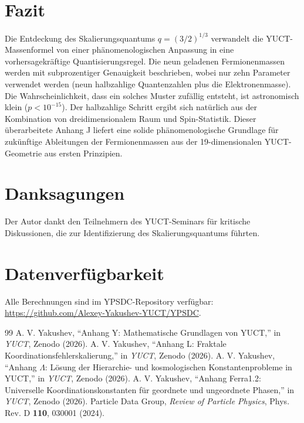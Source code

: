 \documentclass[12pt,a4paper]{article}
\begin{document}
	\section{Fazit}
	
	Die Entdeckung des Skalierungsquantums \(q = (3/2)^{1/3}\) verwandelt die YUCT-Massenformel von einer phänomenologischen Anpassung in eine vorhersagekräftige Quantisierungsregel. Die neun geladenen Fermionenmassen werden mit subprozentiger Genauigkeit beschrieben, wobei nur zehn Parameter verwendet werden (neun halbzahlige Quantenzahlen plus die Elektronenmasse). Die Wahrscheinlichkeit, dass ein solches Muster zufällig entsteht, ist astronomisch klein (\(p < 10^{-15}\)). Der halbzahlige Schritt ergibt sich natürlich aus der Kombination von dreidimensionalem Raum und Spin-Statistik. Dieser überarbeitete Anhang J liefert eine solide phänomenologische Grundlage für zukünftige Ableitungen der Fermionenmassen aus der 19-dimensionalen YUCT-Geometrie aus ersten Prinzipien.
	
	\section*{Danksagungen}
	Der Autor dankt den Teilnehmern des YUCT-Seminars für kritische Diskussionen, die zur Identifizierung des Skalierungsquantums führten.
	
	\section*{Datenverfügbarkeit}
	Alle Berechnungen sind im YPSDC-Repository verfügbar: \url{https://github.com/Alexey-Yakushev-YUCT/YPSDC}.
	
	\begin{thebibliography}{99}
		 A. V. Yakushev, ``Anhang Y: Mathematische Grundlagen von YUCT,'' in \emph{YUCT}, Zenodo (2026).
		 A. V. Yakushev, ``Anhang L: Fraktale Koordinationsfehlerskalierung,'' in \emph{YUCT}, Zenodo (2026).
		 A. V. Yakushev, ``Anhang \(\Lambda\): Lösung der Hierarchie- und kosmologischen Konstantenprobleme in YUCT,'' in \emph{YUCT}, Zenodo (2026).
		 A. V. Yakushev, ``Anhang Ferra1.2: Universelle Koordinationskonstanten für geordnete und ungeordnete Phasen,'' in \emph{YUCT}, Zenodo (2026).
		 Particle Data Group, \emph{Review of Particle Physics}, Phys. Rev. D \textbf{110}, 030001 (2024).
	\end{thebibliography}
	
\end{document}
